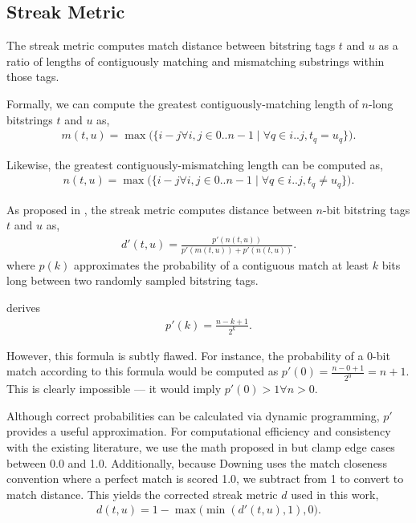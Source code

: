 \subsection{Streak Metric} \label{sec:streak}

The streak metric computes match distance between bitstring tags $t$ and $u$ as a ratio of lengths of contiguously matching and mismatching substrings within those tags.

Formally, we can compute the greatest contiguously-matching length of $n$-long bitstrings $t$ and $u$ as,
\begin{align*}
m(t, u) = \max\Big(\{i - j \forall i, j \in 0..n-1 \mid \forall q \in i..j, t_q = u_q \}\Big).
\end{align*}

Likewise, the greatest contiguously-mismatching length can be computed as,
\begin{align*}
n(t, u) = \max\Big(\{i - j \forall i, j \in 0..n-1 \mid \forall q \in i..j, t_q \neq u_q \}\Big).
\end{align*}

As proposed in \cite{downing2015intelligence}, the streak metric computes distance between $n$-bit bitstring tags $t$ and $u$ as,
\begin{align*}
d'(t, u)
= \frac{p'(n(t,u))}{p'(m(t,u)) + p'(n(t,u))}.
\end{align*}
where $p(k)$ approximates the probability of a contiguous match at least $k$ bits long between two randomly sampled bitstring tags.

\cite{downing2015intelligence} derives
\begin{align*}
p'(k)
= \frac{n - k + 1}{2^k}.
\end{align*}

However, this formula is subtly flawed.
For instance, the probability of a $0$-bit match according to this formula would be computed as $p'(0) = \frac{n - 0 + 1}{2^0} = n + 1$.
This is clearly impossible --- it would imply $p'(0) > 1 \forall n > 0$.

Although correct probabilities can be calculated via dynamic programming, $p'$ provides a useful approximation.
For computational efficiency and consistency with the existing literature, we use the math proposed in \citep{downing2015intelligence} but clamp edge cases between 0.0 and 1.0.
Additionally, because Downing uses the match closeness convention where a perfect match is scored 1.0, we subtract from 1 to convert to match distance.
This yields the corrected streak metric $d$ used in this work,
\begin{align*}
d(t, u) = 1 - \max\Big( \min( d'(t, u), 1), 0 \Big).
\end{align*}

